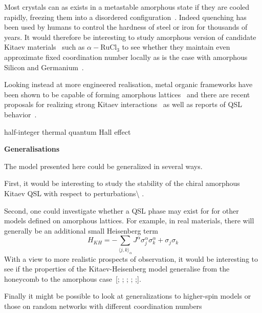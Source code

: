 Most crystals can as exists in a metastable amorphous state if they are cooled rapidly, freezing them into a disordered configuration~\autocite{Weaire1976,Petrakovski1981,Kaneyoshi2018}. Indeed quenching has been used by humans to control the hardness of steel or iron for thousands of years. It would therefore be interesting to study amorphous version of candidate Kitaev materials~\autocite{TrebstPhysRep2022} such as \(\alpha-\textrm{RuCl}_3\) to see whether they maintain even approximate fixed coordination number locally as is the case with amorphous Silicon and Germanium~\autocite{Weaire1971,betteridge1973possible}.

Looking instead at more engineered realisation, metal organic frameworks have been shown to be capable of forming amorphous lattices~\autocite{bennett2014amorphous} and there are recent proposals for realizing strong Kitaev interactions~\autocite{yamadaDesigningKitaevSpin2017} as well as reports of QSL behavior~\autocite{misumiQuantumSpinLiquid2020}.

half-integer thermal quantum Hall effect~\autocite{kasaharaMajoranaQuantizationHalfinteger2018,yokoiHalfintegerQuantizedAnomalous2021}

\textbf{Generalisations}

The model presented here could be generalized in several ways.

First, it would be interesting to study the stability of the chiral amorphous Kitaev QSL with respect to perturbations\textbackslash{} \autocite{Rau2014,Chaloupka2010,Chaloupka2013,Chaloupka2015,Winter2016}.

Second, one could investigate whether a QSL phase may exist for for other models defined on amorphous lattices. For example, in real materials, there will generally be an additional small Heisenberg term \[H_{KH} =  - \sum_{\langle j,k\rangle_\alpha} J^{\alpha}\sigma_j^{\alpha}\sigma_k^{\alpha} + \sigma_j\sigma_k\] With a view to more realistic prospects of observation, it would be interesting to see if the properties of the Kitaev-Heisenberg model generalise from the honeycomb to the amorphous case~{[}\textcite{Chaloupka2010}; \textcite{Chaloupka2015}; \textcite{Jackeli2009}; \textcite{Kalmeyer1989}; \textcite{manousakisSpinTextonehalfHeisenberg1991};{]}.

Finally it might be possible to look at generalizations to higher-spin models or those on random networks with different coordination numbers~\autocite{Baskaran2008,Yao2009,Nussinov2009,Yao2011,Chua2011,Natori2020,Chulliparambil2020,Chulliparambil2021,Seifert2020,WangHaoranPRB2021,Wu2009}

